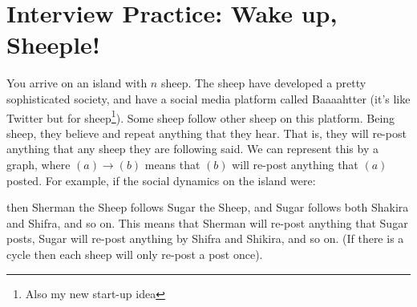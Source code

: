 \documentclass [12pt]{article}
\begin{document}
\section{Interview Practice: Wake up, Sheeple! }

You arrive on an island with $n$ sheep. The sheep have developed a pretty sophisticated society, and have a social media platform called Baaaahtter (it's like Twitter but for sheep\footnote {Also my new start-up idea}). Some sheep follow other sheep on this platform. Being sheep, they believe and repeat anything that they hear. That is, they will re-post anything that any sheep they are following said. We can represent this by a graph, where $(a) \to (b)$ means that $(b)$ will re-post anything that $(a)$ posted. For example, if the social dynamics on the island were: \begin{center}
\end{center} 

then Sherman the Sheep follows Sugar the Sheep, and Sugar follows both Shakira and Shifra, and so on. This means that Sherman will re-post anything that Sugar posts, Sugar will re-post anything by Shifra and Shikira, and so on. (If there is a cycle then each sheep will only re-post a post once). 
\end{document}
